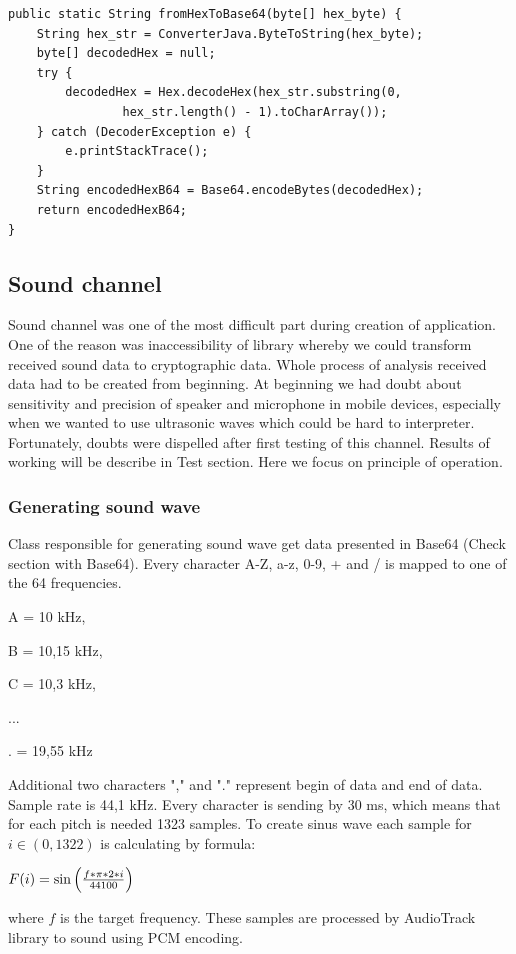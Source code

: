 \documentclass[11pt,titlepage]{article}
\theoremstyle{plain}
\begin{document}
\begin{lstlisting}[caption={Example of code converting from Hex String to Base64 String}]
public static String fromHexToBase64(byte[] hex_byte) {
	String hex_str = ConverterJava.ByteToString(hex_byte);
	byte[] decodedHex = null;
	try {
		decodedHex = Hex.decodeHex(hex_str.substring(0,
				hex_str.length() - 1).toCharArray());
	} catch (DecoderException e) {
		e.printStackTrace();
	}
	String encodedHexB64 = Base64.encodeBytes(decodedHex);
	return encodedHexB64;
}
\end{lstlisting}

\subsection{Sound channel}

Sound channel was one of the most difficult part during creation of application. One of the reason was inaccessibility of library whereby we could transform received sound data to cryptographic data. Whole process of analysis received data had to be created from beginning. At beginning we had doubt about sensitivity and precision of speaker and microphone in mobile devices, especially when we wanted to use ultrasonic waves which could be hard to interpreter. Fortunately, doubts were dispelled after first testing of this channel. Results of working will be describe in Test section. Here we focus on principle of operation.

\subsubsection{Generating sound wave}

Class responsible for generating sound wave get data presented in Base64 (Check section with Base64). Every character A-Z, a-z, 0-9, + and / is mapped to one of the 64 frequencies.

A = 10 kHz,

B = 10,15 kHz,

C = 10,3 kHz,

...

. = 19,55 kHz


Additional two characters "," and "." represent begin of data and end of data. Sample rate is 44,1 kHz. Every character is sending by 30 ms, which means that for each pitch is needed 1323 samples. To create sinus wave each sample for $ i \in (0,1322) $ is calculating by formula:
\begin{center}
$F(i) = \sin\left( f \ast \pi \ast 2 \ast i  \over 44 100  \right)$
\end{center}
where $f$ is the target frequency.
These samples are processed by AudioTrack library to sound using PCM encoding. 
\end{document}

